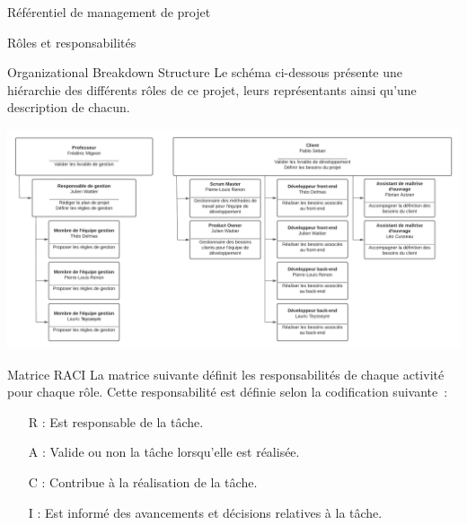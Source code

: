 \documentclass[]{article}
\begin{document}
{\begin{section}{\label{sec:Référentiel de management de projet}Référentiel de management de projet}
\newpage

     \begin{subsection}{\label{sec:Rôles et responsabilités}Rôles et responsabilités}
         \begin{subsubsection}{\label{sec:Organizational Breakdown Structure}Organizational Breakdown Structure}
             Le schéma ci-dessous présente une hiérarchie des différents rôles de ce projet, leurs représentants ainsi qu’une description de chacun.

             \includegraphics[scale=0.32]{documents/IMG/OBS}
         \end{subsubsection}

         \begin{subsubsection}{\label{sec:Matrice RACI}Matrice RACI}
             La matrice suivante définit les responsabilités de chaque activité pour chaque rôle. Cette responsabilité est définie selon la codification suivante :
             \begin{itemize}
                 \item[R]: Est responsable de la tâche.
                 \item[A] : Valide ou non la tâche lorsqu’elle est réalisée.
                 \item[C] : Contribue à la réalisation de la tâche.
                 \item[I] : Est informé des avancements et décisions relatives à la tâche.
             \end{itemize}


\end{subsubsection}
\end{subsection}
\end{section}}
\end{document}
